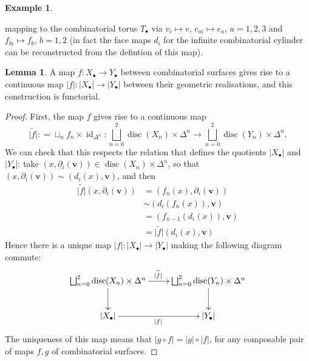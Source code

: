 \documentclass{tufte-handout}
\DeclareMathOperator{\disc}{disc}
\DeclareMathOperator{\id}{id}
\theoremstyle{definition}
\newtheorem{lemma}{Lemma}
\newtheorem{example}{Example}
\begin{document}
\begin{example}
\begin{center}
\end{center}

\noindent mapping to the combinatorial torus $T_\bullet$ via $v_i\mapsto v$, 
$e_{ai}\mapsto e_a$, $a=1,2,3$ and $f_{bi} \mapsto f_b$, $b=1,2$ (in fact the face maps 
$d_i$ for the infinite combinatorial cylinder can be reconstructed from the defintion of this map).
\end{example}

\begin{lemma}
A map $f\colon X_\bullet \to Y_\bullet$ between combinatorial surfaces gives rise to a continuous map 
$|f|\colon |X_\bullet| \to |Y_\bullet|$ between their geometric realisations, and this 
construction is functorial.
\end{lemma}

\begin{proof}
First, the map $f$ gives rise to a continuous map 
\[
	\widetilde{|f|}: = \sqcup_nf_n\times\id_{\Delta^n}\colon \bigsqcup_{n=0}^2 \disc(X_n)\times \Delta^n \to \bigsqcup_{n=0}^2 \disc(Y_n)\times \Delta^n.
\]
We can check that this respects the relation that defines the quotients $|X_\bullet|$ and 
$|Y_\bullet|$: take $(x,\partial_i(\mathbf{v})) \in \disc(X_n)\times \Delta^n$, so that
$(x,\partial_i(\mathbf{v})) \sim (d_i(x),\mathbf{v})$, and then 
\begin{align*}
\widetilde{|f|}(x,\partial_i(\mathbf{v})) & = (f_n(x),\partial_i(\mathbf{v})) \\
& \sim (d_i(f_n(x)),\mathbf{v})\\
& = (f_{n-1}(d_i(x)),\mathbf{v})\\
& = \widetilde{|f|}(d_i(x),\mathbf{v})
\end{align*}
Hence there is a unique map $|f|\colon |X_\bullet| \to |Y_\bullet|$ making the following diagram
commute:
\[
	\xymatrixnocompile{
		\bigsqcup_{n=0}^2 \disc(X_n)\times \Delta^n \ar[d]
			\ar[r]^{\widetilde{|f|}} &
			\bigsqcup_{n=0}^2 \disc(Y_n)\times \Delta^n \ar[d]\\
		|X_\bullet| \ar[r]_{|f|} & |Y_\bullet|
	}
\]
The uniqueness of this map means that $|g\circ f| = |g|\circ |f|$, for any composable pair of
maps $f,g$ of combinatorial surfaces.
\end{proof}
\end{document}
